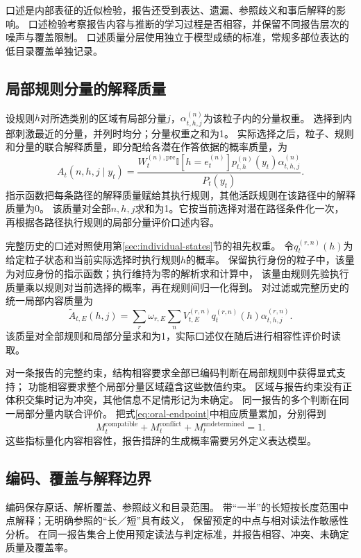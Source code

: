 \documentclass[11pt,a4paper]{article}
\numberwithin{equation}{section}
\newcommand{\ind}{\mathbb{I}}
\begin{document}
口述是内部表征的近似检验，报告还受到表达、遗漏、参照歧义和事后解释的影响。
口述检验考察报告内容与推断的学习过程是否相容，并保留不同报告层次的噪声与覆盖限制。
口述质量分层使用独立于模型成绩的标准，常规多部位表达的低目录覆盖单独记录。

\subsection{局部规则分量的解释质量}
设规则$h$对所选类别的区域有局部分量$j$，$\alpha_{t,h,j}^{(n)}$为该粒子内的分量权重。
选择到内部刺激最近的分量，并列时均分；分量权重之和为1。
实际选择之后，粒子、规则和分量的联合解释质量，即分配给各潜在作答依据的概率质量，为
\begin{equation}
A_t(n,h,j\mid y_t)=
\frac{W_t^{(n),\mathrm{pre}}\ind[h=e_t^{(n)}]p_{t,h}^{(n)}(y_t)
\alpha_{t,h,j}^{(n)}}{P_t(y_t)}.
\label{eq:oral-responsibility}
\end{equation}
指示函数把每条路径的解释质量赋给其执行规则，其他活跃规则在该路径中的解释质量为0。
该质量对全部$n,h,j$求和为1。它按当前选择对潜在路径条件化一次，
再根据各路径执行规则的局部分量评价口述内容。

完整历史的口述对照使用第\ref{sec:individual-states}节的祖先权重。
令$q_t^{(r,n)}(h)$为给定粒子状态和当前实际选择时执行规则$h$的概率。
保留执行身份的粒子中，该量为对应身份的指示函数；执行维持为零的解析求和计算中，
该量由规则先验执行质量乘以规则对当前选择的概率，再在规则间归一化得到。
对过滤或完整历史的统一局部内容质量为
\begin{equation}
\widetilde A_{t,E}(h,j)=\sum_r\omega_{r,E}\sum_n V_{t,E}^{(r,n)}
q_t^{(r,n)}(h)\alpha_{t,h,j}^{(r,n)}.
\label{eq:oral-endpoint}
\end{equation}
该质量对全部规则和局部分量求和为1，实际口述仅在随后进行相容性评价时读取。

对一条报告的完整约束，结构相容要求全部已编码判断在局部规则中获得显式支持；
功能相容要求整个局部分量区域蕴含这些数值约束。
区域与报告约束没有正体积交集时记为冲突，其他信息不足情形记为未确定。
同一报告的多个判断在同一局部分量内联合评价。
把式\eqref{eq:oral-endpoint}中相应质量累加，分别得到
\begin{equation}
M_t^{\mathrm{compatible}}+M_t^{\mathrm{conflict}}+M_t^{\mathrm{undetermined}}=1.
\end{equation}
这些指标量化内容相容性，报告措辞的生成概率需要另外定义表达模型。

\subsection{编码、覆盖与解释边界}
编码保存原话、解析覆盖、参照歧义和目录范围。
带“一半”的长短按长度范围中点解释；无明确参照的“长／短”具有歧义，
保留预定的中点与相对读法作敏感性分析。
在同一报告集合上使用预定读法与判定标准，并报告相容、冲突、未确定质量及覆盖率。
\end{document}

